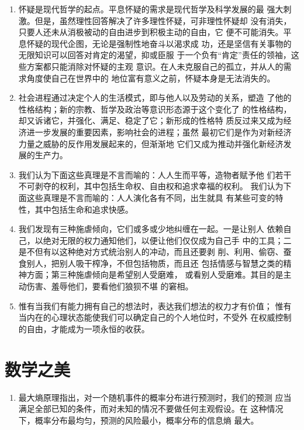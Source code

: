 \documentclass[UTF8]{ctexart}
\begin{document}
\begin{enumerate}
			\item 怀疑是现代哲学的起点。平息怀疑的需求是现代哲学及科学发展的最
			强大刺激。但是，虽然理性回答解决了许多理性怀疑，可非理性怀疑却
			没有消失，只要人还未从消极被动的自由进步到积极主动的自由，它
			便不可能消失。平息怀疑的现代企图，无论是强制性地奋斗以渴求成
			功，还是坚信有关事物的无限知识可以回答对肯定的渴望，抑或臣服
			于一个负有“肯定”责任的领袖，这些方案都只能消除对怀疑的主观
			意识。在人未克服自己的孤立，并从人的需求角度使自己在世界中的
			地位富有意义之前，怀疑本身是无法消失的。
			
			\item 社会进程通过决定个人的生活模式，即与他人以及劳动的关系，塑造
			了他的性格结构；新的宗教、哲学及政治等意识形态源于这个变化了
			的性格结构，却又诉诸它，并强化、满足、稳定了它；新形成的性格特
			质反过来又成为经济进一步发展的重要因素，影响社会的进程；虽然
			最初它们是作为对新经济力量之威胁的反作用发展起来的，但渐渐地
			它们又成为推动并强化新经济发展的生产力。
			
			\item 我们认为下面这些真理是不言而喻的：人人生而平等，造物者赋予他
			们若干不可剥夺的权利，其中包括生命权、自由权和追求幸福的权利。
			我们认为下面这些真理是不言而喻的：人人演化各有不同，出生就具
			有某些可变的特性，其中包括生命和追求快感。
			
			\item 我们发现有三种施虐倾向，它们或多或少地纠缠在一起。一是让别人
			依赖自己，以绝对无限的权力通知他们，以便让他们仅仅成为自己手
			中的工具；二是不但有以这种绝对方式统治别人的冲动，而且还要剥
			削、利用、偷窃、蚕食别人，把别人吸干榨净，不但包括物质，而且还
			包括情感与智慧之类的精神方面；第三种施虐倾向是希望别人受磨难，
			或看别人受磨难。其目的是主动伤害、羞辱他们，要看他们狼狈不堪
			的窘相。
			
			\item 惟有当我们有能力拥有自己的想法时，表达我们想法的权力才有价值；
			惟有当内在的心理状态能使我们可以确定自己的个人地位时，不受外
			在权威控制的自由，才能成为一项永恒的收获。
	
		\end{enumerate}
	
		\newpage
	
	
	\section{数学之美}
	
	
		\begin{enumerate}
		
			\item 最大熵原理指出，对一个随机事件的概率分布进行预测时，我们的预测
			应当满足全部已知的条件，而对未知的情况不要做任何主观假设。在
			这种情况下，概率分布最均匀，预测的风险最小，概率分布的信息熵
			最大。
		
		\end{enumerate}
\end{document}
